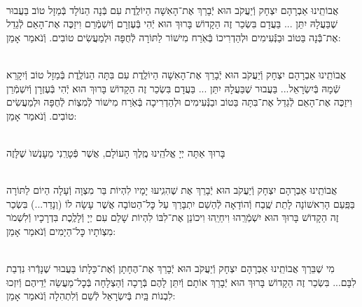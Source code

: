\documentclass[twoside, openany, parskip=half, 11pt]{book}
\begin{document}
\begin{sometimes}



\\
אֲבוֹתֵֽינוּ אַבְרָהָם יִצְחָק וְֿיַעֲקֹב הוּא יְֿבָרֵךְ אֶת־הָאִשָׁה הַיוֹלֶֽדֶת
 עִם בְּֿנָה הַנוֹלָד בְּֿמַזָל טוֹב בַּעֲבוּר שֶׁבַּעֲלָהּ יִתֵּן ... בַּעֲדָם בִּשְׂכַר זֶה הַקָדוֹשׁ בָּרוּךְ הוּא יְֿהִי בְּֿעֶזְרָם וְֿיִשְׁמְֿרֵם וִיזַכֶּה אֶת־הָאֵם לְֿגַדֵל אֶת־בְּֿֿנָה בַּטוֹב וּבַנְּֿֿעִימִים וּלְהַדְרִיכוֹ בְּֿאֹֽרַח מִישׁוֹר לַתּוֹרָה לְֿחֻפָּה וּלְמַעֲשִׂים טוֹבִים. וְֿנֹאמַר אָמֵן:



\\
 אֲבוֹתֵֽינוּ אַבְרָהָם יִצְחָק וְֿיַעֲקֹב הוּא יְֿבָרֵךְ אֶת־הָאִשָׁה הַיוֹלֶֽדֶת
 עִם בִּתָּה הַנוֹלֶֽדֶת בְּֿמַזָל טוֹב וְֿיִקָרֵא שְֿׁמָהּ בְּֿיִשְׂרָאֵל... בַּעֲבוּר שֶׁבַּעֲלָהּ יִתֵּן ... בַּעֲדָם בִּשְׂכַר זֶה הַקָדוֹשׁ בָּרוּךְ הוּא יְֿהִי בְּֿעֶזְרָן וְֿיִשְׁמְֿרֵן וִיזַכֶּה אֶת־הָאֵם לְֿגַדֵל אֶת־בִּתָּה בַּטוֹב ובַנְּֿֿעִימִים וּלְהַדְרִיכָה בְּֿאֹֽרַח מִישׁוֹר לְֿמִצְוֹת לְֿחֻפָּה וּלְמַעֲשִׂים טוֹבִים. וְֿנֹאמַר אָמֵן:

\\
 בָּרוּךְ אַתָּה יְיָ אֱלֹהֵֽינוּ מֶֽלֶךְ הָעוֹלָם, אֲשֶׁר פְּֿטָרַֽנִי מֵעׇנְשׁוׂ שֶׁלָּזֶה

\\
אֲבוֹתֵֽינוּ אַבְרָהָם יִצְחָק וְֿיַעֲקֹב הוּא יְֿבָרֵךְ אֶת
 שֶׁהִגִֽיעוּ יָמָיו לִהְיוֹת בַּר מִצְוָה וְֿעָלָה הַיוֹם לַתּוֹרָה בַּפַּֽעַם הָרִאשׁוֹנָה לָתֵת שֶֽׁבַח וְֿהוֹדָאָה לְֿהַשֵׁם יִתְבָּרַךְ עַל כׇּל־הַטוֹבָה אֲשֶׁר עָשָׂה לוֹ (וְנָדַר...) בִּשְׂכַר זֶה הַקָדוֹשׁ בָּרוּךְ הוּא יִשְׁמְֿרֵֽהוּ וִיחַיֵֽהוּ וִיכוֹנֵן אֶת־לִבּוֹ לִהְיוֹת שָׁלֵם עִם יְיָ וְֿלָלֶֽכֶת בִּדְרָכָיו וְֿלִשְׁמֹר מִצְוֹתָיו כׇּל־הַיָמִים וְֿנֹאמַר אָמֵן:


\\
מִי שֶׁבֵּרַךְ אֲבוֹתֵֽינוּ אַבְרָהָם יִצְחָק וְֿיַעֲקֹב הוּא יְֿבָרֵךְ אֶת־הֶחָתָן  וְֿאֶת־כַּלָתוֹ בַּעֲבוּר שֶׁנָדְֿרוּ נִדְבַת לִבָּם... בִּשְׂכַר זֶה הַקָדוֹשׁ בָּרוּךְ הוּא יְֿבָרֵךְ אוֹתָם וְֿיִתֵּן לָהֶם בְּֿרָכָה וְֿהַצְלָחָה בְּֿכׇל־מַעֲשֵׂה יְֿדֵיהֶם וְֿיִזְכוּ לִבְנוֹת בַּֽיִת בְּֿיִשְׂרָאֵל לְֿשֵׁם וְֿלִתְהִלָה וְֿנֹאמַר אָמֵן:


\end{sometimes}
\end{document}
